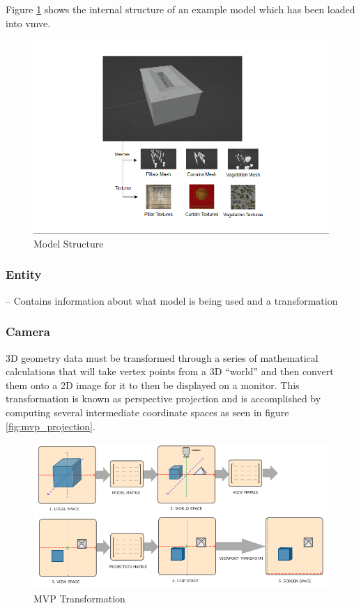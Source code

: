 \documentclass[11pt]{article}
\begin{document}
Figure \ref{fig:model} shows the internal structure of an example model which has been
loaded into \gls{vmve}.
\begin{figure}[h!]
  \centering
  \includegraphics[width=\textwidth]{images/model.png}
  \caption{Model Structure}
  \label{fig:model}
\end{figure}

\subsubsection{Entity}
-- Contains information about what model is being used and a transformation


\subsubsection{Camera}
3D geometry data must be transformed through a series of mathematical
calculations that will take vertex points from a 3D ``world'' and then convert
them onto a 2D image for it to then be displayed on a monitor. This
transformation is known as perspective projection \cite{3d_projection} and is
accomplished by computing several intermediate coordinate spaces as seen in
figure \ref{fig:mvp_projection}.

\begin{figure}[h!]
  \centering
  \includegraphics[width=\textwidth]{images/mvp.png}
  \caption{MVP Transformation \cite{coordinate_systems}}
  \label{fig:mvp_transformation} 
\end{figure}
\end{document}

